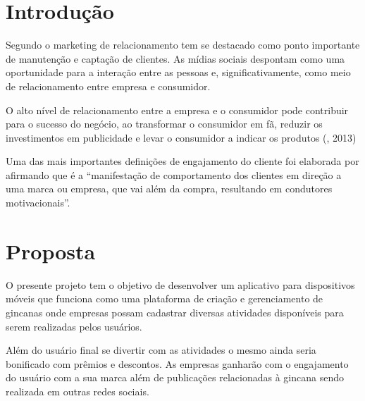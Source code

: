 \documentclass[
    12pt,               %
    openright,          %
    oneside,
    a4paper,            %
    draft,              %
    MODELO,             %
    TODO,               %
    english,            %
    brazil              %
    ]{ifsp-spo-inf-ctds}
\begin{document}
\frenchspacing 

\pretextual

\imprimirfolhaderosto

\textual

\section{Introdução}
Segundo \citeauthor{analaura:2016} o marketing de relacionamento tem se destacado como ponto importante de manutenção e captação de clientes. As mídias sociais despontam como uma oportunidade para a interação entre as pessoas e, significativamente, como meio de relacionamento entre
empresa e consumidor.

O alto nível de relacionamento entre a empresa e o consumidor pode contribuir para o sucesso do negócio, ao transformar o consumidor em fã, reduzir os
investimentos em publicidade e levar o
consumidor a indicar os produtos (\citeauthor{guilherme:2013}, 2013)

Uma das mais importantes definições
de engajamento do cliente foi elaborada por \citeauthor{jenny:2010} afirmando que é a “manifestação de comportamento dos clientes em direção a uma marca ou empresa, que vai além da compra, resultando em condutores motivacionais”.

\section{Proposta}
O presente projeto tem o objetivo de desenvolver um aplicativo para dispositivos móveis que funciona como uma plataforma de criação e gerenciamento de gincanas onde empresas possam cadastrar diversas atividades disponíveis para serem realizadas pelos usuários.

Além do usuário final se divertir com as atividades o mesmo ainda seria bonificado com prêmios e descontos. As empresas ganharão com o engajamento do usuário com a sua marca além de publicações relacionadas à gincana sendo realizada em outras redes sociais.
\end{document}
